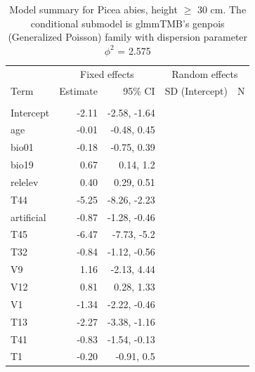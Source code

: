 \documentclass[
]{article}
\begin{document}
\begin{longtable}[t]{lrrrr}
\caption{\label{tab:summaries-tables}\label{tab:PaNA}Model summary for Picea abies, height $\geq$ 30 cm. The conditional submodel is glmmTMB's genpois (Generalized Poisson) family with dispersion parameter $\phi^{2}$ = 2.575}\\
\toprule
\multicolumn{1}{c}{ } & \multicolumn{2}{c}{Fixed effects} & \multicolumn{2}{c}{Random effects} \\
\cmidrule(l{3pt}r{3pt}){2-3} \cmidrule(l{3pt}r{3pt}){4-5}
Term & Estimate & 95\% CI & SD (Intercept) & N\\
\midrule
\addlinespace[0.3em]
\multicolumn{5}{l}{\textbf{Conditional model}}\\
\hspace{1em}Intercept & -2.11 & -2.58, -1.64 &  & \\
\hspace{1em}age & -0.01 & -0.48, 0.45 &  & \\
\hspace{1em}bio01 & -0.18 & -0.75, 0.39 &  & \\
\hspace{1em}bio19 & 0.67 & 0.14, 1.2 &  & \\
\hspace{1em}relelev & 0.40 & 0.29, 0.51 &  & \\
\hspace{1em}T44 & -5.25 & -8.26, -2.23 &  & \\
\hspace{1em}artificial & -0.87 & -1.28, -0.46 &  & \\
\hspace{1em}T45 & -6.47 & -7.73, -5.2 &  & \\
\hspace{1em}T32 & -0.84 & -1.12, -0.56 &  & \\
\hspace{1em}V9 & 1.16 & -2.13, 4.44 &  & \\
\hspace{1em}V12 & 0.81 & 0.28, 1.33 &  & \\
\hspace{1em}V1 & -1.34 & -2.22, -0.46 &  & \\
\hspace{1em}T13 & -2.27 & -3.38, -1.16 &  & \\
\hspace{1em}T41 & -0.83 & -1.54, -0.13 &  & \\
\hspace{1em}T1 & -0.20 & -0.91, 0.5 &  & \\

\end{longtable}
\end{document}
